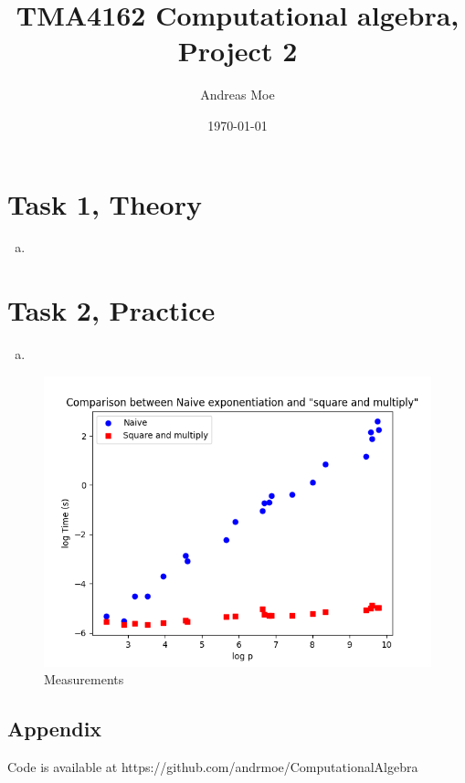 \documentclass[12pt,a4paper]{article}
\title{TMA4162 Computational algebra, Project 2}
\author{Andreas Moe}
\date{\today}
\begin{document}
\maketitle

\section*{Task 1, Theory}
\begin{enumerate}[a)]
    \item 
\end{enumerate}

\section*{Task 2, Practice}

\begin{enumerate}[a)]
    \item 
\end{enumerate}

\begin{figure}[htbp]
    \centering
    \includegraphics[width=\linewidth]{plot_2025-01-24 14-39-00_0.png}
    \caption{Measurements}
    \label{figure1}
\end{figure}
\newpage
\begin{appendix}
\section*{Appendix}
    Code is available at https://github.com/andrmoe/ComputationalAlgebra
    
\end{appendix}
\end{document}
